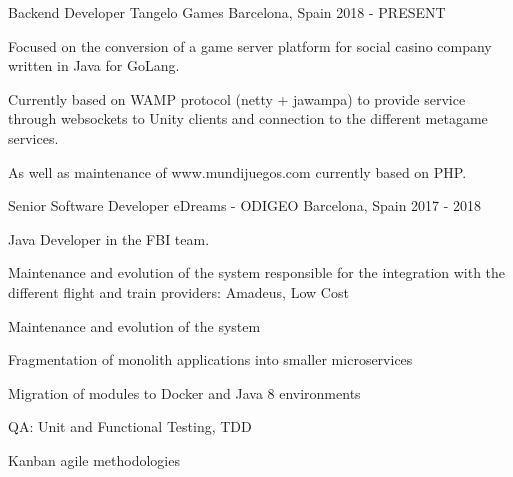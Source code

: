 

\begin{cventries}

  \cventry
    {Backend Developer} %
    {Tangelo Games} %
    {Barcelona, Spain} %
    {2018 - PRESENT} %
    {
      \begin{cvitems} %
        \item {Focused on the conversion of a game server platform for social casino company written in Java for GoLang.}
        \item {Currently based on WAMP protocol (netty + jawampa) to provide service through websockets to Unity clients and connection to the different metagame services.}
        \item {As well as maintenance of www.mundijuegos.com currently based on PHP.}
      \end{cvitems}
    }

  \cventry
    {Senior Software Developer} %
    {eDreams - ODIGEO} %
    {Barcelona, Spain} %
    {2017 - 2018} %
    {
      \begin{cvitems} %
        \item {Java Developer in the FBI team.}
        \item {Maintenance and evolution of the system responsible for the integration with the different flight and train providers: Amadeus, Low Cost}
        \item {Maintenance and evolution of the system}
        \item {Fragmentation of monolith applications into smaller microservices}
        \item {Migration of modules to Docker and Java 8 environments}
        \item {QA: Unit and Functional Testing, TDD}
        \item {Kanban agile methodologies}
      \end{cvitems}
    }


\end{cventries}
